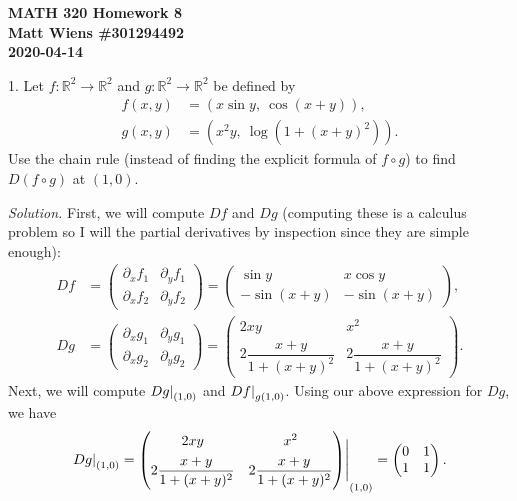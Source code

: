 \documentclass{article}
\newcommand{\0}{\mathbf{0}}
\newcommand{\R}{\mathbb{R}}
\begin{document}
\textbf{MATH 320 Homework 8} \\
\textbf{Matt Wiens \#301294492} \\
\textbf{2020-04-14}

1. Let $f: \R^2 \to \R^2$ and $g: \R^2 \to \R^2$ be defined by
%
\begin{align*}
    f(x, y) &= (x \sin y, \ \cos(x+y)), \\
    g(x, y) &= (x^2 y, \ \log (1+(x+y)^2))
    .
\end{align*}
%
Use the chain rule (instead of finding the explicit formula of $f \circ
g$) to find $D(f \circ g)$ at $(1, 0)$.

\textit{Solution.}
First, we will compute $D f$ and $D g$ (computing these is a calculus
problem so I will the partial derivatives by inspection since they
are simple enough):
%
\begin{align*}
    D f
    &=
        \begin{pmatrix}
            \partial_x f_1 & \partial_y f_1 \\
            \partial_x f_2 & \partial_y f_2
        \end{pmatrix}
    =
        \begin{pmatrix}
            \sin y & x \cos y \\
            - \sin(x + y) & - \sin(x + y)
        \end{pmatrix}
        ,
    \\
    D g
    &=
        \begin{pmatrix}
            \partial_x g_1 & \partial_y g_1 \\
            \partial_x g_2 & \partial_y g_2
        \end{pmatrix}
    =
        \begin{pmatrix}
            2 x y & x^2 \\[5pt]
            2 \dfrac{x + y}{1 + (x + y)^2} & 2 \dfrac{x + y}{1 + (x + y)^2}
        \end{pmatrix}
        .
\end{align*}
%
Next, we will compute $\eval[0]{D g}_{(1, 0)}$ and $\eval[0]{D f}_{g(1,
0)}$. Using our above expression for $D g$, we have
%
\begin{equation*}
    \eval[0]{D g}_{(1, 0)}
    =
    \eval{
        \begin{pmatrix}
            2 x y & x^2 \\[5pt]
            2 \dfrac{x + y}{1 + (x + y)^2} & 2 \dfrac{x + y}{1 + (x + y)^2}
        \end{pmatrix}
    }_{(1, 0)}
    =
        \begin{pmatrix}
            0 & 1 \\
            1 & 1
        \end{pmatrix}
    .
\end{equation*}
\end{document}
